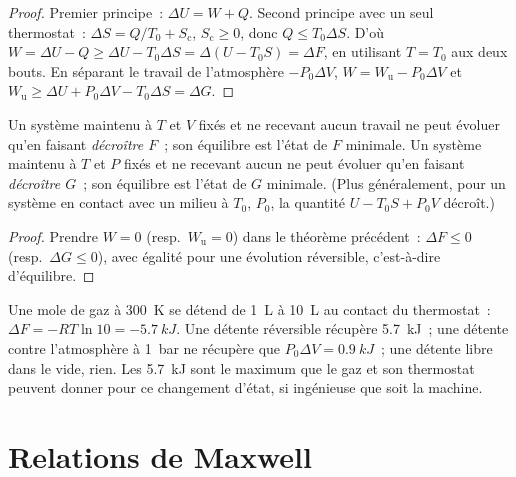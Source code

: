 \begin{proof}
Premier principe~: $\Delta U = W + Q$. Second principe avec un seul thermostat~: $\Delta S
= Q/T_0 + S_{\text{c}}$, $S_{\text{c}} \ge 0$, donc $Q \le T_0\Delta S$. D'où
$W = \Delta U - Q \ge \Delta U - T_0\Delta S = \Delta(U - T_0S) = \Delta F$, en utilisant
$T = T_0$ aux deux bouts. En séparant le travail de l'atmosphère $-P_0\Delta V$,
$W = W_{\text{u}} - P_0\Delta V$ et $W_{\text{u}} \ge \Delta U + P_0
\Delta V - T_0\Delta S = \Delta G$.
\end{proof}

\begin{theorem}\label{thm:b2:thermodynamic-potentials:criteria}
Un système maintenu à $T$ et $V$ fixés et ne recevant aucun travail ne peut
évoluer qu'en faisant \emph{décroître $F$}~; son équilibre est l'état de
$F$ minimale. Un système maintenu à $T$ et $P$ fixés et ne recevant aucun  ne peut évoluer qu'en faisant \emph{décroître $G$}~; son équilibre est
l'état de $G$ minimale. (Plus généralement, pour un système en contact avec
un milieu à $T_0$, $P_0$, la quantité $U - T_0S + P_0V$ décroît.)
\end{theorem}

\begin{proof}
Prendre $W = 0$ (resp.\ $W_{\text{u}} = 0$) dans le théorème précédent~: $\Delta F
\le 0$ (resp.\ $\Delta G \le 0$), avec égalité pour une évolution réversible,
c'est-à-dire d'équilibre.
\end{proof}

\begin{example}\label{ex:b2:thermodynamic-potentials:expansion}
Une mole de gaz à \qty{300}{K} se détend de \qty{1}{L} à \qty{10}{L} au
contact du thermostat~: $\Delta F = -RT\ln 10 = \qty{-5.7}{kJ}$. Une
détente réversible récupère \qty{5.7}{kJ}~; une détente contre
l'atmosphère à \qty{1}{bar} ne récupère que $P_0\Delta V = \qty{0.9}{kJ}$~; une
détente libre dans le vide, rien. Les \qty{5.7}{kJ} sont le maximum
que le gaz et son thermostat peuvent donner pour ce changement d'état, si
ingénieuse que soit la machine.
\end{example}

\section{Relations de Maxwell}

